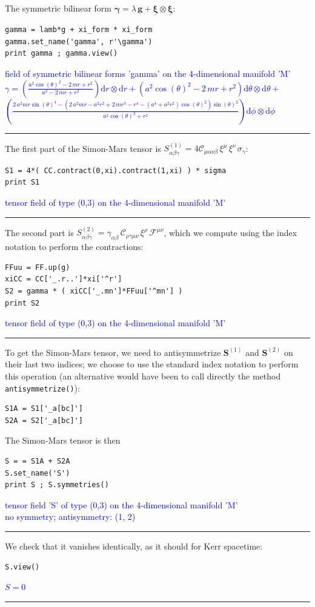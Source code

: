 \documentclass[a4paper]{jpconf}
\newcommand{\code}[1]{\texttt{#1}}
\newcommand{\w}[1]{\bm{#1}}
\newcommand{\soutput}[1]{\textcolor{blue}{#1}\\[-0.8ex]\rule{\textwidth}{0.4pt}}
\begin{document}
The symmetric bilinear form
$\w{\gamma} = \lambda \, \w{g} + \underline{\w{\xi}}\otimes\underline{\w{\xi}}$:
\begin{verbatim}
gamma = lamb*g + xi_form * xi_form
gamma.set_name('gamma', r'\gamma')
print gamma ; gamma.view()
\end{verbatim}
\soutput{field of symmetric bilinear forms 'gamma' on the 4-dimensional manifold
'M'\\
$\gamma = \left( \frac{a^{2} \cos\left(\theta\right)^{2} - 2 \, m r +
r^{2}}{a^{2} - 2 \, m r + r^{2}} \right) \mathrm{d} r\otimes \mathrm{d}
r + \left( a^{2} \cos\left(\theta\right)^{2} - 2 \, m r + r^{2} \right)
\mathrm{d} \theta\otimes \mathrm{d} \theta +$\\
$\left( \frac{2 \, a^{2} m r
\sin\left(\theta\right)^{4} - {\left(2 \, a^{2} m r - a^{2} r^{2} + 2 \,
m r^{3} - r^{4} - {\left(a^{4} + a^{2} r^{2}\right)}
\cos\left(\theta\right)^{2}\right)} \sin\left(\theta\right)^{2}}{a^{2}
\cos\left(\theta\right)^{2} + r^{2}} \right) \mathrm{d} \phi\otimes
\mathrm{d} \phi$}
The first part of the Simon-Mars tensor is 
$S^{(1)}_{\alpha\beta\gamma} = 4 \mathcal{C}_{\mu\alpha\nu\beta} \, \xi^\mu \, \xi^\nu \, \sigma_\gamma$:
\begin{verbatim}
S1 = 4*( CC.contract(0,xi).contract(1,xi) ) * sigma
print S1
\end{verbatim}
\soutput{tensor field of type (0,3) on the 4-dimensional manifold 'M'}
The second part is 
$S^{(2)}_{\alpha\beta\gamma} = \gamma_{\alpha\beta} \, \mathcal{C}_{\rho\gamma\mu\nu} \, \xi^\rho \, \mathcal{F}^{\mu\nu}$, which we 
compute using the index notation to perform the contractions:
\begin{verbatim}
FFuu = FF.up(g)
xiCC = CC['_.r..']*xi['^r']
S2 = gamma * ( xiCC['_.mn']*FFuu['^mn'] )
print S2
\end{verbatim}
\soutput{tensor field of type (0,3) on the 4-dimensional manifold 'M'}
To get the Simon-Mars tensor, we need to antisymmetrize $\w{S}^{(1)}$ and
$\w{S}^{(2)}$ on their last two indices; we choose to use the standard
index notation to perform this operation (an alternative would have been
to call directly the method \code{antisymmetrize()}):
\begin{verbatim}
S1A = S1['_a[bc]']
S2A = S2['_a[bc]']
\end{verbatim}
The Simon-Mars tensor is then 
\begin{verbatim}
S = = S1A + S2A
S.set_name('S')
print S ; S.symmetries()
\end{verbatim}
\soutput{tensor field 'S' of type (0,3) on the 4-dimensional manifold 'M'\\
no symmetry;  antisymmetry: (1, 2)}
We check that it vanishes identically, as it should for Kerr spacetime:
\begin{verbatim}
S.view()
\end{verbatim}
\soutput{$S=0$}
\begin{verbatim}
\end{verbatim}
\begin{verbatim}
\end{verbatim}
\end{document}
